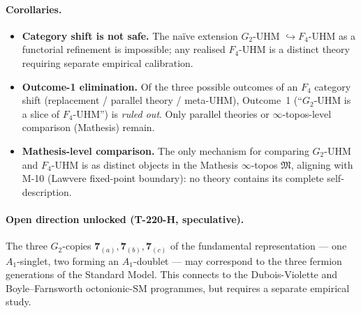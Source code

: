 \paragraph{Corollaries.}
\begin{itemize}[leftmargin=2em,nosep]
  \item \textbf{Category shift is not safe.} The na\"ive extension
        $G_2$-UHM $\hookrightarrow F_4$-UHM as a functorial refinement
        is impossible; any realised $F_4$-UHM is a distinct theory
        requiring separate empirical calibration.
  \item \textbf{Outcome-1 elimination.} Of the three possible
        outcomes of an $F_4$ category shift (replacement / parallel
        theory / meta-UHM), Outcome~1 (``$G_2$-UHM is a slice of
        $F_4$-UHM'') is \emph{ruled out}. Only parallel theories or
        $\infty$-topos-level comparison (Mathesis) remain.
  \item \textbf{Mathesis-level comparison.} The only mechanism for
        comparing $G_2$-UHM and $F_4$-UHM is as distinct objects in
        the Mathesis $\infty$-topos $\mathfrak M$, aligning with M-10
        (Lawvere fixed-point boundary): no theory contains its
        complete self-description.
\end{itemize}

\paragraph{Open direction unlocked (T-220-H, speculative).}
The three $G_2$-copies $\mathbf 7_{(a)}, \mathbf 7_{(b)}, \mathbf
7_{(c)}$ of the fundamental representation --- one $A_1$-singlet, two
forming an $A_1$-doublet --- may correspond to the three fermion
generations of the Standard Model. This connects to the
Dubois-Violette and Boyle--Farnsworth octonionic-SM programmes, but
requires a separate empirical study.


